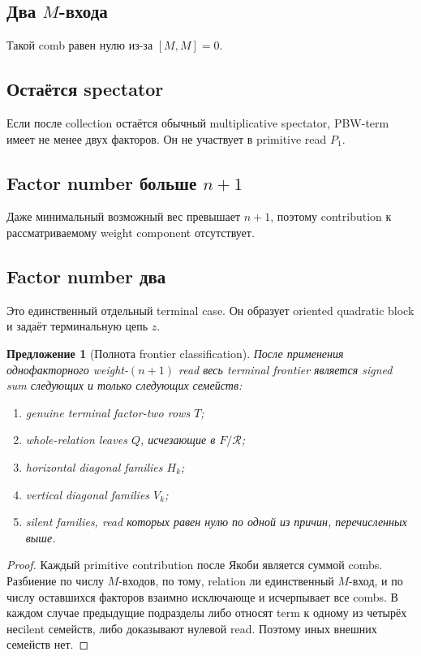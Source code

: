 \documentclass[11pt,a4paper]{article}
\newtheorem{proposition}[theorem]{Предложение}
\theoremstyle{definition}
\theoremstyle{remark}
\newcommand{\Rel}{\mathcal R}
\begin{document}
\subsection{Два $M$-входа}

Такой comb равен нулю из-за $[M,M]=0$.

\subsection{Остаётся spectator}

Если после collection остаётся обычный multiplicative spectator, PBW-term
имеет не менее двух факторов. Он не участвует в primitive read $P_1$.

\subsection{Factor number больше $n+1$}

Даже минимальный возможный вес превышает $n+1$, поэтому contribution к
рассматриваемому weight component отсутствует.

\subsection{Factor number два}

Это единственный отдельный terminal case. Он образует oriented quadratic
block и задаёт терминальную цепь $z$.

\begin{proposition}[Полнота frontier classification]\label{prop:frontier-classification}
После применения однофакторного weight-$(n+1)$ read весь terminal frontier
является signed sum следующих и только следующих семейств:
\begin{enumerate}
\item genuine terminal factor-two rows $T$;
\item whole-relation leaves $Q$, исчезающие в $F/\Rel$;
\item horizontal diagonal families $H_k$;
\item vertical diagonal families $V_k$;
\item silent families, read которых равен нулю по одной из причин,
перечисленных выше.
\end{enumerate}
\end{proposition}

\begin{proof}
Каждый primitive contribution после Якоби является суммой combs. Разбиение
по числу $M$-входов, по тому, relation ли единственный $M$-вход, и по числу
оставшихся факторов взаимно исключающе и исчерпывает все combs. В каждом
случае предыдущие подразделы либо относят term к одному из четырёх
несilent семейств, либо доказывают нулевой read. Поэтому иных внешних
семейств нет.
\end{proof}
\end{document}
